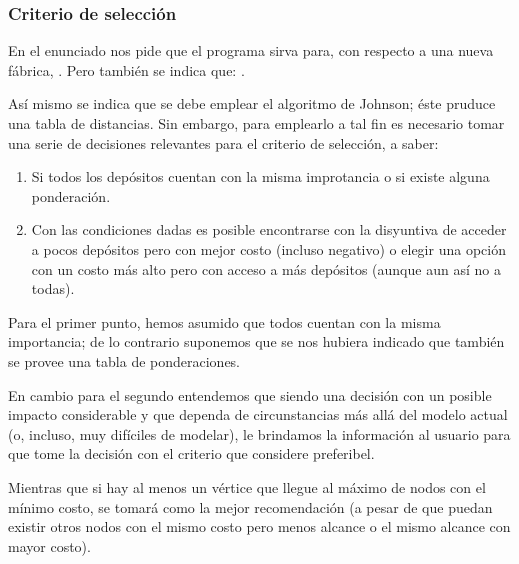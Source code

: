 \documentclass[../tp2_grupo404.tex]{subfiles}
\begin{document}
\subsubsection{Criterio de selección}

En el enunciado nos pide que el programa sirva para, con respecto a una nueva fábrica,
.
Pero también se indica que: .

Así mismo se indica que se debe emplear el algoritmo de Johnson; éste
pruduce una tabla de distancias. Sin embargo, para emplearlo a tal fin es
necesario tomar una serie de decisiones relevantes para el criterio de selección,
a saber:
\begin{enumerate}
    \item Si todos los depósitos cuentan con la misma improtancia o si existe
    alguna ponderación.
    \item Con las condiciones dadas es posible encontrarse con la disyuntiva de
    acceder a pocos depósitos pero con mejor costo (incluso negativo) o elegir
    una opción con un costo más alto pero con acceso a más depósitos (aunque aun
    así no a todas).
\end{enumerate}

Para el primer punto, hemos asumido que todos cuentan con la misma importancia;
de lo contrario suponemos que se nos hubiera indicado que también se provee
una tabla de ponderaciones.

En cambio para el segundo entendemos que siendo una decisión con un posible
impacto considerable y que dependa de circunstancias más allá del modelo actual
(o, incluso, muy difíciles de modelar), le brindamos la información al usuario
para que tome la decisión con el criterio que considere preferibel.

Mientras que si hay al menos un vértice que llegue al máximo de nodos con el
mínimo costo, se tomará como la mejor recomendación (a pesar de que puedan
existir otros nodos con el mismo costo pero menos alcance o el mismo alcance
con mayor costo).
\end{document}
